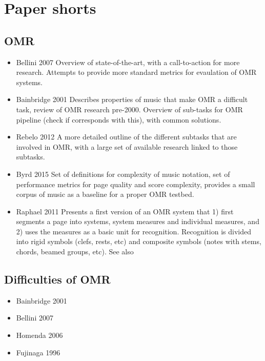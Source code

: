 \section{Paper shorts}

\subsection{OMR}
\begin{itemize}
    \item Bellini 2007 \citep{Bellini2007} Overview of state-of-the-art, with a call-to-action for more research. Attempts to provide more standard metrics for evaulation of OMR systems.
    \item Bainbridge 2001 \citep{Bainbridge2001} Describes properties of music that make OMR a difficult task, review of OMR research pre-2000. Overview of sub-tasks for OMR pipeline (check if \citep{Rebelo2012} corresponds with this), with common solutions.
    \item Rebelo 2012\citep{Rebelo2012} A more detailed outline of the different subtasks that are involved in OMR, with a large set of available research linked to those subtasks. \citep{}
    \item Byrd 2015 \citep{Byrd2015} Set of definitions for complexity of music notation, set of performance metrics for page quality and score complexity, provides a small corpus of music as a baseline for a proper OMR testbed. 
    \item Raphael 2011 \citep{Raphael2011} Presents a first version of an OMR system that 1) first segments a page into systems, system measures and individual measures, and 2) uses the measures as a basic unit for recognition. Recognition is divided into rigid symbols (clefs, rests, etc) and composite symbols (notes with stems, chords, beamed groups, etc). See also \citep{Chen2016}
\end{itemize}

\subsection{Difficulties of OMR}
\begin{itemize}
    \item Bainbridge 2001 \citep{Bainbridge2001} 
    \item Bellini 2007 \citep{Bellini2007}
    \item Homenda 2006 \citep{Homenda2006} 
    \item Fujinaga 1996 \citep{Fujinaga1996}
\end{itemize}

